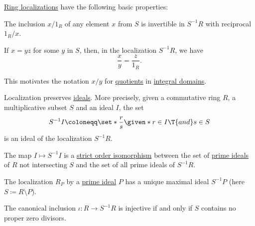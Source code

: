 \begin{proposition}\label{thm:def:ring_localization}
  \hyperref[def:ring_localization]{Ring localizations} have the following basic properties:

  \begin{thmenum}
     The inclusion \( x / 1_R \) of any element \( x \) from \( S \) is invertible in \( S^{-1} R \) with reciprocal \( 1_R / x \).

     If \( x = yz \) for some \( y \) in \( S \), then, in the localization \( S^{-1} R \), we have
    \begin{equation*}
      \frac x y = \frac z {1_R}.
    \end{equation*}

    This motivates the notation \( x / y \) for \hyperref[def:domain_quotient]{quotients} in \hyperref[def:integral_domain]{integral domains}.

     Localization preserves \hyperref[def:semiring_ideal]{ideals}. More precisely, given a commutative ring \( R \), a multiplicative subset \( S \) and an ideal \( I \), the set
    \begin{equation*}
      S^{-1} I \coloneqq \set*{ \frac r s \given* r \in I \T{and} s \in S }
    \end{equation*}
    is an ideal of the localization \( S^{-1} R \).

     The map \( I \mapsto S^{-1} I \) is a \hyperref[def:partially_ordered_set/morphism]{strict order isomorphism} between the set of \hyperref[def:ring/subobject]{prime ideals} of \( R \) not intersecting \( S \) and the set of all prime ideals of \( S^{-1} R \).

     The localization \( R_P \) by a \hyperref[def:semiring_ideal/prime]{prime ideal} \( P \) has a unique maximal ideal \( S^{-1} P \) (here \( S \coloneqq R \setminus P \)).

     The canonical inclusion \( \iota: R \to S^{-1} R \) is injective if and only if \( S \) contains no proper zero divisors.
  \end{thmenum}
\end{proposition}
